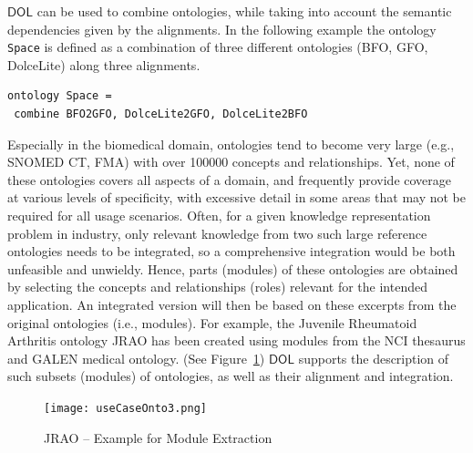 \documentclass[10pt, a4paper]{isov2}
\newcommand*{\DOL}{\ensuremath{\mathsf{DOL}}\xspace}
\renewcommand{\figurerefname}{Figure}
\renewcommand{\fref}[1]{\figurerefname~\ref{#1}}
\begin{document}
 \DOL can be used to combine ontologies, while taking into account the semantic dependencies given by the alignments. In the following example the ontology \lstinline{Space} is defined as a combination of three different ontologies (BFO, GFO, DolceLite) along three alignments.

\begin{lstlisting}[basicstyle=\ttfamily\footnotesize,language=dolText,escapechar=@,mathescape]
ontology Space =
 combine BFO2GFO, DolceLite2GFO, DolceLite2BFO
\end{lstlisting}




\label{onto-3}
Especially in the biomedical domain, ontologies tend to become very large (e.g., SNOMED CT, FMA)
with over 100000 concepts and relationships. Yet, none of these ontologies covers all aspects of a
domain, and frequently provide coverage at various levels of specificity, with excessive detail in
some areas that may not be required for all usage scenarios. Often, for a given knowledge
representation problem in industry, only relevant knowledge from two such large reference
ontologies needs to be integrated, so a comprehensive integration would be both unfeasible and
unwieldy. Hence, parts (modules) of these ontologies are obtained by selecting the concepts and
relationships (roles) relevant for the intended application. An integrated version will then be
based on these excerpts from the original ontologies (i.e., modules). For example, the Juvenile
Rheumatoid Arthritis ontology JRAO has been created using modules from the NCI thesaurus and GALEN
medical ontology. (See \fref{JRAO}) \DOL
supports the description of such subsets (modules) of ontologies, as well as their alignment and
integration.


\begin{figure}[htbp]
\begin{center}
\texttt{[image: useCaseOnto3.png]}
\caption{JRAO  -- Example for Module Extraction}
\label{JRAO}
\end{center}
\end{figure}
\end{document}
